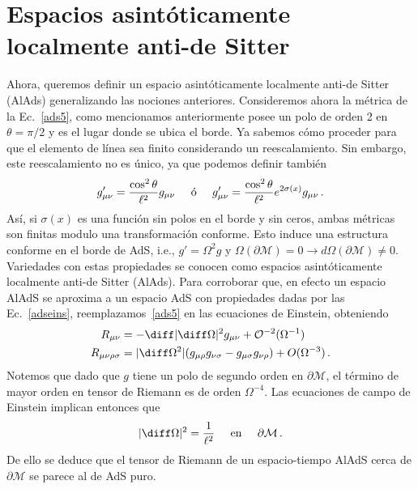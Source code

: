 \documentclass[../Main.tex]{subfiles}
\begin{document}
\section{Espacios asintóticamente localmente anti-de Sitter}
Ahora, queremos definir un espacio asintóticamente localmente anti-de Sitter (AlAds) generalizando las nociones anteriores. Consideremos ahora la métrica de la Ec.~\eqref{ads5}, como mencionamos anteriormente posee un polo de orden 2 en $\theta=\pi/2$ y es el lugar donde se ubica el borde. Ya sabemos cómo proceder para que el elemento de línea sea finito considerando un reescalamiento. Sin embargo, este reescalamiento no es único, ya que podemos definir también 
\begin{align}\notag
 g'_{\mu\nu}=\frac{\cos^2{\theta}}{\ell^2}g_{\mu\nu} \;\;\;\;\; \mbox{ó} \;\;\;\;\; 
 g'_{\mu\nu}=\frac{\cos^2{\theta}}{\ell^2}e^{2\sigma(x)}g_{\mu\nu}\, .
\end{align}
Así, si $\sigma(x)$ es una función sin polos en el borde y sin ceros, ambas métricas son finitas modulo una transformación conforme. Esto induce una estructura conforme en el borde de AdS, i.e., $g'=\Omega^2 g$ y $\Omega(\partial \mathcal{M})=0\to d\Omega(\partial \mathcal{M})\neq 0$. Variedades con estas propiedades se conocen como espacios asintóticamente localmente anti-de Sitter (AlAds). Para corroborar que, en efecto un espacio AlAdS se aproxima a un espacio AdS con propiedades dadas por las Ec.~\eqref{adseins}, reemplazamos~\eqref{ads5} en las ecuaciones de Einstein, obteniendo
\begin{align}\notag
    R_{\mu\nu}&=-\diff|\diff\Omega|^2 g_{\mu\nu}+\mathcal{O}^{-2}(\Omega^{-1})\\
    R_{\mu\nu\rho\sigma}&=|\diff\Omega^2|(g_{\mu\rho}g_{\nu\sigma}-g_{\mu\sigma}g_{\nu\rho})+{O}(\Omega^{-3}) \, .
\end{align}
Notemos que dado que $g$ tiene un polo de segundo orden en $\partial \mathcal{M}$, el término de mayor orden en tensor de Riemann es de orden $\Omega^{-4}$. Las ecuaciones de campo de Einstein implican entonces que 
\begin{align}
    |\diff\Omega|^2=\frac{1}{\ell^2}\;\;\;\;\;\mbox{en}\;\;\;\;\; \partial\mathcal{M}\, .
\end{align}
De ello se deduce que el tensor de Riemann de un espacio-tiempo AlAdS cerca de $\partial\mathcal{M}$ se parece al de AdS puro.
\end{document}
